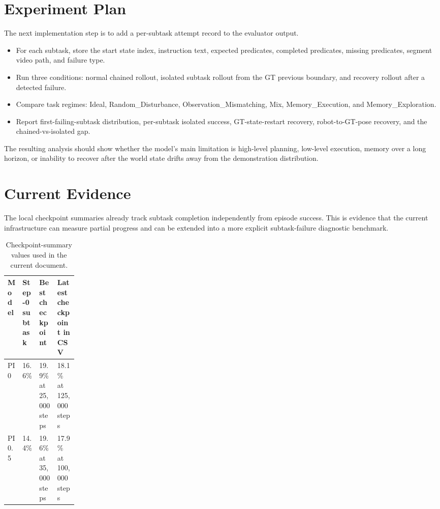 \documentclass[11pt]{article}
\begin{document}
\section{Experiment Plan}

The next implementation step is to add a per-subtask attempt record to the evaluator output.

\begin{itemize}
  \item For each subtask, store the start state index, instruction text, expected predicates, completed predicates, missing predicates, segment video path, and failure type.
  \item Run three conditions: normal chained rollout, isolated subtask rollout from the GT previous boundary, and recovery rollout after a detected failure.
  \item Compare task regimes: Ideal, Random\_Disturbance, Observation\_Mismatching, Mix, Memory\_Execution, and Memory\_Exploration.
  \item Report first-failing-subtask distribution, per-subtask isolated success, GT-state-restart recovery, robot-to-GT-pose recovery, and the chained-vs-isolated gap.
\end{itemize}

The resulting analysis should show whether the model's main limitation is high-level planning, low-level execution, memory over a long horizon, or inability to recover after the world state drifts away from the demonstration distribution.

\section{Current Evidence}

The local checkpoint summaries already track subtask completion independently from episode success. This is evidence that the current infrastructure can measure partial progress and can be extended into a more explicit subtask-failure diagnostic benchmark.

\begin{table}[htbp]
\centering
\caption{Checkpoint-summary values used in the current document.}
\begin{tabularx}{\linewidth}{>{\raggedright\arraybackslash}p{0.16\linewidth}Y Y Y}
\toprule
\textbf{Model} & \textbf{Step-0 subtask} & \textbf{Best checkpoint} & \textbf{Latest checkpoint in CSV} \\
\midrule
PI0 & 16.6\% & 19.9\% at 25,000 steps & 18.1\% at 125,000 steps \\
PI0.5 & 14.4\% & 19.6\% at 35,000 steps & 17.9\% at 100,000 steps \\
\bottomrule
\end{tabularx}
\end{table}
\end{document}

